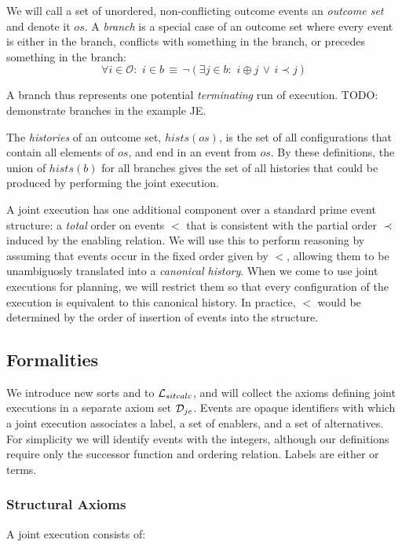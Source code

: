 We will call a set of unordered, non-conflicting outcome events an
\emph{outcome set} and denote it $os$. A \emph{branch} is a special
case of an outcome set where every event is either in the branch,
conflicts with something in the branch, or precedes something in the
branch: \[
\forall i\in\mathcal{O}:\,\, i\in b\,\equiv\,\neg(\exists j\in b:\,\, i\oplus j\,\vee\, i\prec j)\]


A branch thus represents one potential \emph{terminating }run of execution.
TODO: demonstrate branches in the example JE.

The \emph{histories} of an outcome set, $hists(os)$, is the set of
all configurations that contain all elements of $os$, and end in
an event from $os$. By these definitions, the union of $hists(b)$
for all branches gives the set of all histories that could be produced
by performing the joint execution. 

A joint execution has one additional component over a standard prime
event structure: a \emph{total} order on events $<$ that is consistent
with the partial order $\prec$ induced by the enabling relation.
We will use this to perform reasoning by assuming that events occur
in the fixed order given by $<$, allowing them to be unambiguosly
translated into a \emph{canonical history}. When we come to use joint
executions for planning, we will restrict them so that every configuration
of the execution is equivalent to this canonical history. In practice,
$<$ would be determined by the order of insertion of events into
the structure.


\subsection{Formalities}

We introduce new sorts and  to $\mathcal{L}_{sitcalc}$,
and will collect the axioms defining joint executions in a separate
axiom set $\mathcal{D}_{je}$. Events are opaque identifiers with which a
joint execution associates a label, a set of enablers, and a set of
alternatives. For simplicity we will identify events with the integers,
although our definitions require only the successor function and ordering
relation. Labels are either  or  terms.


\subsubsection{Structural Axioms}

A joint execution consists of:

